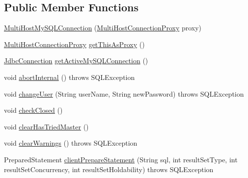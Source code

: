\subsection*{Public Member Functions}
\begin{DoxyCompactItemize}
\item 
\mbox{\hyperlink{classcom_1_1mysql_1_1cj_1_1jdbc_1_1ha_1_1_multi_host_my_s_q_l_connection_ab742e8241444987701d70af53732d8e6}{Multi\+Host\+My\+S\+Q\+L\+Connection}} (\mbox{\hyperlink{classcom_1_1mysql_1_1cj_1_1jdbc_1_1ha_1_1_multi_host_connection_proxy}{Multi\+Host\+Connection\+Proxy}} proxy)
\item 
\mbox{\hyperlink{classcom_1_1mysql_1_1cj_1_1jdbc_1_1ha_1_1_multi_host_connection_proxy}{Multi\+Host\+Connection\+Proxy}} \mbox{\hyperlink{classcom_1_1mysql_1_1cj_1_1jdbc_1_1ha_1_1_multi_host_my_s_q_l_connection_aa33e9c3bfc5b8d21bcd6c45b551e2cd7}{get\+This\+As\+Proxy}} ()
\item 
\mbox{\hyperlink{interfacecom_1_1mysql_1_1cj_1_1jdbc_1_1_jdbc_connection}{Jdbc\+Connection}} \mbox{\hyperlink{classcom_1_1mysql_1_1cj_1_1jdbc_1_1ha_1_1_multi_host_my_s_q_l_connection_a66ac2a6eb7f2c971e62d47c92624f818}{get\+Active\+My\+S\+Q\+L\+Connection}} ()
\item 
void \mbox{\hyperlink{classcom_1_1mysql_1_1cj_1_1jdbc_1_1ha_1_1_multi_host_my_s_q_l_connection_a1f78b90c599fa58090713a8fd1303d2a}{abort\+Internal}} ()  throws S\+Q\+L\+Exception 
\item 
void \mbox{\hyperlink{classcom_1_1mysql_1_1cj_1_1jdbc_1_1ha_1_1_multi_host_my_s_q_l_connection_a12c407fe2d10ba1f27cae220289f8adf}{change\+User}} (String user\+Name, String new\+Password)  throws S\+Q\+L\+Exception 
\item 
void \mbox{\hyperlink{classcom_1_1mysql_1_1cj_1_1jdbc_1_1ha_1_1_multi_host_my_s_q_l_connection_aaca35ad8d7fae96cb649f1f14f2dbc13}{check\+Closed}} ()
\item 
void \mbox{\hyperlink{classcom_1_1mysql_1_1cj_1_1jdbc_1_1ha_1_1_multi_host_my_s_q_l_connection_a1de3c2673c06d90de1baee65b7607ef0}{clear\+Has\+Tried\+Master}} ()
\item 
void \mbox{\hyperlink{classcom_1_1mysql_1_1cj_1_1jdbc_1_1ha_1_1_multi_host_my_s_q_l_connection_a2b18d0742519558ab0680c7c137722a1}{clear\+Warnings}} ()  throws S\+Q\+L\+Exception 
\item 
Prepared\+Statement \mbox{\hyperlink{classcom_1_1mysql_1_1cj_1_1jdbc_1_1ha_1_1_multi_host_my_s_q_l_connection_a90d99874278a283359f65712794b4524}{client\+Prepare\+Statement}} (String sql, int result\+Set\+Type, int result\+Set\+Concurrency, int result\+Set\+Holdability)  throws S\+Q\+L\+Exception 

\end{DoxyCompactItemize}
